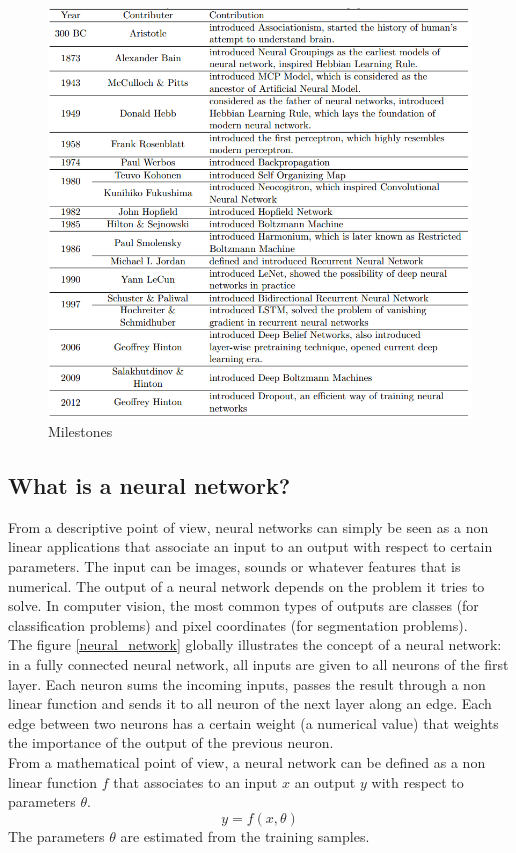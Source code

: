 \begin{figure}[!h]
\centering
\includegraphics[width=1\textwidth, keepaspectratio=true]{./figures/history.png}
\caption{Milestones }
\label{history}
\end{figure}

 
\subsection{What is a neural network?}
\label{what_is_a_neural_network}

From a descriptive point of view, neural networks can simply be seen as a non linear applications that associate an input to an output with respect to certain parameters. The input can be images, sounds or whatever features that is numerical. The output of a neural network depends on the problem it tries to solve. In computer vision, the most common types of outputs  are classes (for classification problems) and pixel coordinates (for segmentation problems).\\
The figure \ref{neural_network} globally illustrates the concept of a neural network: in a fully connected neural network,  all inputs are given to all neurons of the first layer. Each neuron sums the incoming inputs, passes the result through a non linear function and sends it to all neuron of the next layer along an edge. Each edge between two neurons has a certain weight (a numerical value) that weights the importance of the output of the previous neuron.\\
From a mathematical point of view, a neural network can be defined as a non linear function $f$ that associates to an input $x$ an output $y$ with respect to parameters $\theta$.
\begin{equation}
y = f(x,\theta)
\end{equation}
The parameters $\theta$ are estimated from the training samples.

